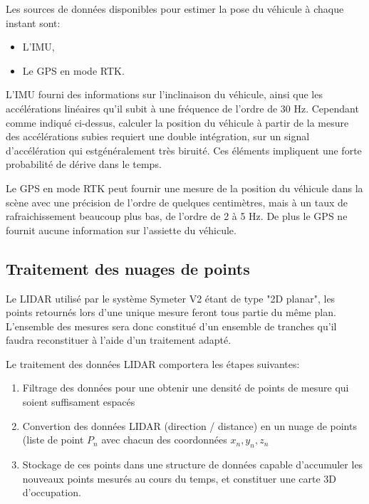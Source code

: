 \documentclass[12pt,a4paper]{report}
\begin{document}
		\para Les sources de données disponibles pour estimer la pose du véhicule à chaque instant sont:
		\begin{itemize}
			\item L'IMU,
			\item Le GPS en mode RTK.
		\end{itemize}
		
		\para L'IMU fourni des informations sur l'inclinaison du véhicule, ainsi que les accélérations linéaires qu'il subit à une fréquence de l'ordre de 30 Hz. Cependant comme indiqué ci-dessus, calculer la position du véhicule à partir de la mesure des accélérations subies requiert une double intégration, sur un signal d'accélération qui estgénéralement très biruité. Ces éléments impliquent une forte probabilité de dérive dans le temps.
		
		\para Le GPS en mode RTK peut fournir une mesure de la position du véhicule dans la scène avec une précision de l'ordre de quelques centimètres, mais à un taux de rafraichissement beaucoup plus bas, de l'ordre de 2 à 5 Hz. De plus le GPS ne fournit aucune information sur l'assiette du véhicule.
		
			
			
		
		\subsection{Traitement des nuages de points}
		Le LIDAR utilisé par le système Symeter V2 étant de type "2D planar", les points retournés lors d'une unique mesure feront tous partie du même plan. L'ensemble des mesures sera donc constitué d'un ensemble de tranches qu'il faudra reconstituer à l'aide d'un traitement adapté.
		
		\para Le traitement des données LIDAR comportera les étapes suivantes:
		\begin{enumerate}
			\item Filtrage des données pour une obtenir une densité de points de mesure qui soient suffisament espacés
			\item Convertion des données LIDAR (direction / distance) en un nuage de points (liste de point $P_n$ avec chacun des coordonnées $x_n, y_n, z_n$
			\item Stockage de ces points dans une structure de données capable d'accumuler les nouveaux points mesurés au cours du temps, et constituer une carte 3D d'occupation.
 		\end{enumerate}
 	
\end{document}
